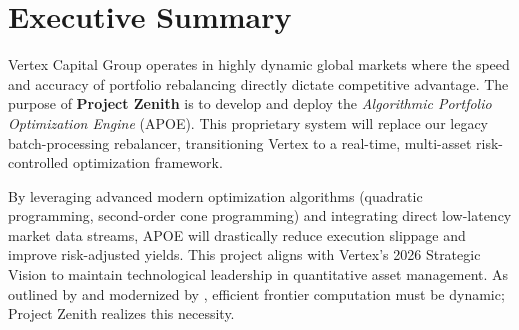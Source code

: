 \section{Executive Summary}
Vertex Capital Group operates in highly dynamic global markets where the speed and accuracy of portfolio rebalancing directly dictate competitive advantage. The purpose of \textbf{Project Zenith} is to develop and deploy the \textit{Algorithmic Portfolio Optimization Engine} (APOE). This proprietary system will replace our legacy batch-processing rebalancer, transitioning Vertex to a real-time, multi-asset risk-controlled optimization framework.

By leveraging advanced modern optimization algorithms (quadratic programming, second-order cone programming) and integrating direct low-latency market data streams, APOE will drastically reduce execution slippage and improve risk-adjusted yields. This project aligns with Vertex's 2026 Strategic Vision to maintain technological leadership in quantitative asset management. As outlined by \textcite{markowitz1952portfolio} and modernized by \textcite{black1992global}, efficient frontier computation must be dynamic; Project Zenith realizes this necessity.
